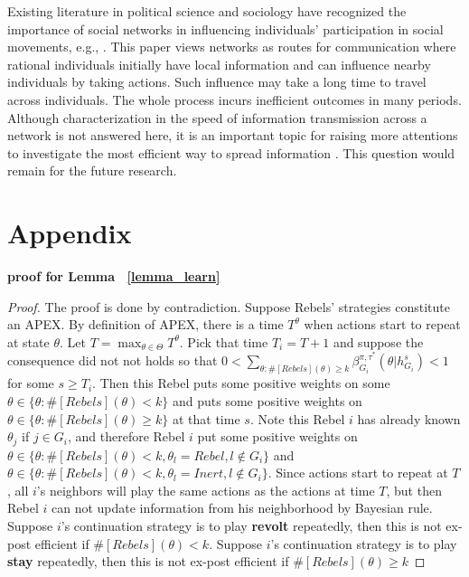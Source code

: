 \documentclass[12pt,letterpaper]{article}
\newtheorem*{main result}{Main Result}
\theoremstyle{definition}
\theoremstyle{remark}
\theoremstyle{claim}
\begin{document}
Existing literature in political science and sociology have recognized the importance of social networks in influencing individuals' participation in social movements, e.g., \citep{Passy2003}\citep{McAdam2003}\citep{Siegel2009}. This paper views networks as routes for communication where rational individuals initially have local information and can influence nearby individuals by taking actions. Such influence may take a long time to travel across individuals. The whole process incurs inefficient outcomes in many periods. Although characterization in the speed of information transmission across a network is not answered here, it is an important topic for raising more attentions to investigate the most efficient way to spread information . This question would remain for the future research.






\appendix
\section{Appendix}

\noindent\textbf{proof for Lemma ~\ref{lemma_learn}}

\begin{proof}
The proof is done by contradiction. Suppose Rebels' strategies constitute an APEX. By definition of APEX, there is a time $T^{\theta}$ when actions start to repeat at state $\theta$. Let $T=\max_{\theta\in \Theta}{T^{\theta}}$. Pick that time $T_i=T+1$ and suppose the consequence did not not holds so that $0<\sum_{\theta:\#[Rebels](\theta)\geq k}\beta^{\pi,\tau^*}_{G_i}(\theta|h^{s}_{G_i})<1$ for some $s\geq T_i$. Then this Rebel puts some positive weights on some $\theta\in \{\theta:\#[Rebels](\theta)< k\}$ and puts some positive weights on $\theta\in \{\theta:\#[Rebels](\theta)\geq k\}$ at that time $s$. Note this Rebel $i$ has already known $\theta_j$ if $j\in G_i$, and therefore Rebel $i$ put some positive weights on $\theta\in \{\theta:\#[Rebels](\theta)< k, \theta_l=Rebel, l\notin G_i\}$ and $\theta\in \{\theta:\#[Rebels](\theta)< k, \theta_l=Inert, l\notin G_i\}$. Since actions start to repeat at $T$, all $i$'s neighbors will play the same actions as the actions at time $T$, but then Rebel $i$ can not update information from his neighborhood by Bayesian rule. Suppose $i$'s continuation strategy is to play \textbf{revolt} repeatedly, then this is not ex-post efficient if $\#[Rebels](\theta)< k$. Suppose $i$'s continuation strategy is to play \textbf{stay} repeatedly, then this is not ex-post efficient if $\#[Rebels](\theta)\geq k$
\end{proof}
\end{document}
